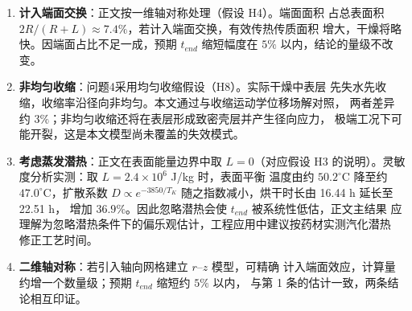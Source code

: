 \documentclass[12pt,a4paper]{article}
\newcommand{\prompt}[1]{\par\noindent\textbf{【写作提示】}#1\par}      %
\newcommand{\ph}[1]{\textbf{【#1】}}                                   %
\newcommand{\handbook}[2]{\par\noindent\textbf{【手册索引：#1】} #2\par}
\begin{document}
\begin{enumerate}
\item \textbf{计入端面交换}：正文按一维轴对称处理（假设 H4）。端面面积
占总表面积 $2R/(R+L)\approx7.4\%$，若计入端面交换，有效传热传质面积
增大，干燥将略快。因端面占比不足一成，预期 $t_{end}$ 缩短幅度在 $5\%$
以内，结论的量级不改变。
\item \textbf{非均匀收缩}：问题4采用均匀收缩假设（H8）。实际干燥中表层
先失水先收缩，收缩率沿径向非均匀。本文通过与收缩运动学位移场解对照，
两者差异约 $3\%$；非均匀收缩还将在表层形成致密壳层并产生径向应力，
极端工况下可能开裂，这是本文模型尚未覆盖的失效模式。
\item \textbf{考虑蒸发潜热}：正文在表面能量边界中取 $L=0$（对应假设
H3 的说明）。灵敏度分析实测：取 $L=2.4\times10^6$ J/kg 时，表面平衡
温度由约 $50.2^\circ$C 降至约 $47.0^\circ$C，扩散系数 $D\propto
e^{-3850/T_K}$ 随之指数减小，烘干时长由 16.44 h 延长至 22.51 h，
增加 $36.9\%$。因此忽略潜热会使 $t_{end}$ 被系统性低估，正文主结果
应理解为忽略潜热条件下的偏乐观估计，工程应用中建议按药材实测汽化潜热
修正工艺时间。
\item \textbf{二维轴对称}：若引入轴向网格建立 $r$--$z$ 模型，可精确
计入端面效应，计算量约增一个数量级；预期 $t_{end}$ 缩短约 $5\%$ 以内，
与第 1 条的估计一致，两条结论相互印证。
\end{enumerate}




\end{document}

